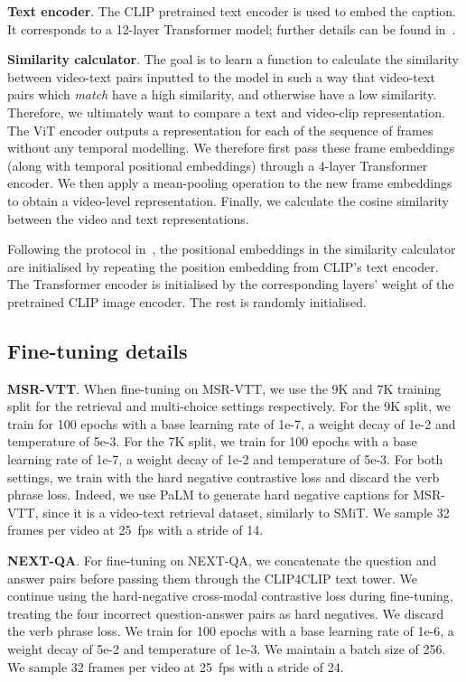 \noindent \textbf{Text encoder}. The CLIP pretrained text encoder is used to embed the caption. It corresponds to a 12-layer Transformer model; further details can be found in~\cite{Radford2021CLIP}. 

\noindent \textbf{Similarity calculator}. The goal is to learn a function to calculate the similarity between video-text pairs inputted to the model in such a way that video-text pairs which \textit{match} have a high similarity, and otherwise have a low similarity.  Therefore, we ultimately want to compare a text and video-clip representation. The ViT encoder outputs a representation for each of the sequence of frames  without any temporal modelling. We therefore first pass these frame embeddings (along with temporal positional embeddings) through a 4-layer Transformer encoder. We then apply a mean-pooling operation to the new frame embeddings to obtain a video-level representation. Finally, we calculate the cosine similarity between the video and text representations.

Following the protocol in~\cite{Luo2021CLIP4Clip}, the positional embeddings in the similarity calculator are initialised by repeating the position embedding from CLIP's text encoder. The Transformer encoder is initialised by the corresponding layers' weight of the pretrained CLIP image encoder. The rest is randomly initialised. 



\subsection{Fine-tuning details}\label{subsec:app:finetuning}

\noindent \textbf{MSR-VTT}. When fine-tuning on MSR-VTT, we use the 9K and 7K training split for the retrieval and multi-choice settings respectively. For the 9K split, we train for 100 epochs with a base learning rate of 1e-7, a weight decay of 1e-2 and temperature of 5e-3. For the 7K split, we train for 100 epochs with a base learning rate of 1e-7, a weight decay of 1e-2 and temperature of 5e-3. For both settings, we train with the hard negative contrastive loss and discard the verb phrase loss. Indeed, we use PaLM to generate hard negative captions for MSR-VTT, since it is a video-text retrieval dataset, similarly to SMiT. We sample 32 frames per video at 25~fps with a stride of 14.

\noindent \textbf{NEXT-QA}. For fine-tuning on NEXT-QA, we concatenate the question and answer pairs before passing them through the CLIP4CLIP text tower. We continue using the hard-negative cross-modal contrastive loss during fine-tuning, treating the four incorrect question-answer pairs as hard negatives. We discard the verb phrase loss. We train for 100 epochs with a base learning rate of 1e-6, a weight decay of 5e-2 and temperature of 1e-3. We maintain a batch size of 256. We sample 32 frames per video at 25~fps with a stride of 24.

